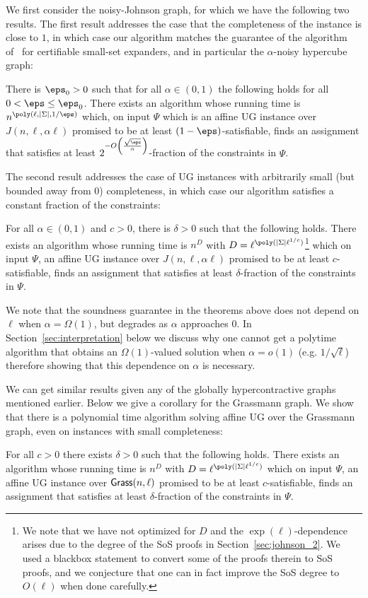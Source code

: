 We first consider the noisy-Johnson graph, 
for which we have the following two results.
The first result addresses the case that 
the completeness of the instance is close to 
$1$, in which case our algorithm matches the 
guarantee of the algorithm of~\cite{BBKSS} 
for certifiable small-set expanders, and in particular the $\alpha$-noisy hypercube graph:
\begin{theorem}\label{thm:main_johnson_close_to_1}
There is $\eps_0>0$
such that for all $\alpha\in (0,1)$ 
the following holds for all $0<\eps\leq \eps_0$.
There exists an algorithm whose running time is $n^{\poly(\ell,|\Sigma|,1/\eps)}$ which, on input
$\Psi$ which is an affine UG instance over $J(n,\ell,\alpha\ell)$ promised to be at least $(1-\eps)$-satisfiable, finds an assignment that satisfies 
at least $2^{-O\left(\frac{\sqrt{\eps}}{\alpha}\right)}$-fraction of the constraints in $\Psi$.
\end{theorem}


The second result addresses the case of UG instances with arbitrarily small (but bounded away from $0$) completeness, in which case our algorithm satisfies a constant fraction of the constraints:
\begin{theorem}\label{thm:main_johnson}
For all $\alpha\in (0,1)$ and $c>0$, there is $\delta>0$ such that the following holds. 
There exists an algorithm whose running time is $n^{D}$ with $D = \ell^{\poly(|\Sigma|\ell^{1/c})}$\footnote{We note that we have not optimized for $D$ and the $\exp(\ell)$-dependence arises due to the degree of the SoS proofs in Section~\ref{sec:johnson_2}. We used a blackbox statement to convert some of the proofs therein to SoS proofs, and we conjecture that one can in fact improve the SoS degree to $O(\ell)$ when done carefully.} which on input
$\Psi$, an affine UG instance over $J(n,\ell,\alpha \ell)$ promised to be at least $c$-satisfiable, finds an assignment that satisfies 
at least $\delta$-fraction of the constraints in $\Psi$.
\end{theorem}

We note that the soundness guarantee in the theorems above does not depend on $\ell$ when $\alpha = \Omega(1)$, but degrades as $\alpha$ approaches $0$. In Section~\ref{sec:interpretation} below we discuss why one cannot get a polytime algorithm that obtains an $\Omega(1)$-valued solution when $\alpha = o(1)$ (e.g. $1/\sqrt{\ell}$) therefore showing that this dependence on $\alpha$ is necessary.

We can get similar results given any of the globally hypercontractive graphs mentioned earlier. Below
we give a corollary for the Grassmann graph.
We show that there is a polynomial time algorithm solving affine UG over the Grassmann graph, even on 
instances with small completeness:
\begin{theorem}\label{thm:main_grass}
For all $c>0$ there exists $\delta>0$ such that the following holds. There exists an algorithm whose running time is $n^{D}$ with $D = \ell^{\poly(|\Sigma|\ell^{1/c})}$ which
on input $\Psi$, an affine UG instance over 
${\sf Grass}(n,\ell)$ promised to be at least $c$-satisfiable, finds an assignment that satisfies 
at least $\delta$-fraction of the constraints in $\Psi$.
\end{theorem}

